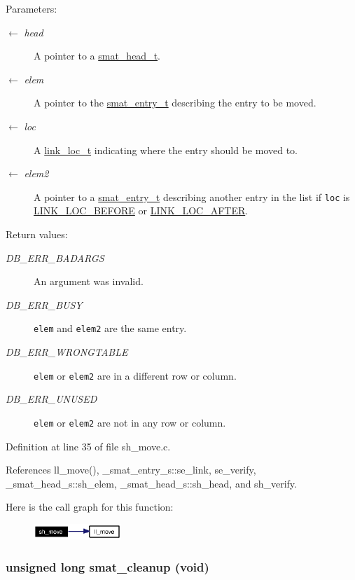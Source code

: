 \begin{Desc}
\item[Parameters:]
\begin{description}
\item[\mbox{$\leftarrow$} {\em head}]A pointer to a \hyperlink{group__dbprim__smat_ga1}{smat\_\-head\_\-t}. \item[\mbox{$\leftarrow$} {\em elem}]A pointer to the \hyperlink{group__dbprim__smat_ga2}{smat\_\-entry\_\-t} describing the entry to be moved. \item[\mbox{$\leftarrow$} {\em loc}]A \hyperlink{group__dbprim__link_ga4}{link\_\-loc\_\-t} indicating where the entry should be moved to. \item[\mbox{$\leftarrow$} {\em elem2}]A pointer to a \hyperlink{group__dbprim__smat_ga2}{smat\_\-entry\_\-t} describing another entry in the list if {\tt loc} is \hyperlink{group__dbprim__link_gga28a135}{LINK\_\-LOC\_\-BEFORE} or \hyperlink{group__dbprim__link_gga28a136}{LINK\_\-LOC\_\-AFTER}.\end{description}
\end{Desc}
\begin{Desc}
\item[Return values:]
\begin{description}
\item[{\em DB\_\-ERR\_\-BADARGS}]An argument was invalid. \item[{\em DB\_\-ERR\_\-BUSY}]{\tt elem} and {\tt elem2} are the same entry. \item[{\em DB\_\-ERR\_\-WRONGTABLE}]{\tt elem} or {\tt elem2} are in a different row or column. \item[{\em DB\_\-ERR\_\-UNUSED}]{\tt elem} or {\tt elem2} are not in any row or column.\end{description}
\end{Desc}


Definition at line 35 of file sh\_\-move.c.

References ll\_\-move(), \_\-smat\_\-entry\_\-s::se\_\-link, se\_\-verify, \_\-smat\_\-head\_\-s::sh\_\-elem, \_\-smat\_\-head\_\-s::sh\_\-head, and sh\_\-verify.

Here is the call graph for this function:\begin{figure}[H]
\begin{center}
\leavevmode
\includegraphics[width=94pt]{group__dbprim__smat_ga21_cgraph}
\end{center}
\end{figure}
\hypertarget{group__dbprim__smat_ga8}{
\subsubsection[smat\_\-cleanup]{\setlength{\rightskip}{0pt plus 5cm}unsigned long smat\_\-cleanup (void)}}
\label{group__dbprim__smat_ga8}


